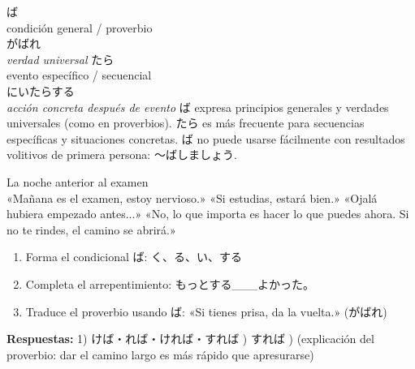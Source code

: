   {ば\\\small condición general / proverbio\\\small {}がばれ\\\textit{verdad universal}}
  {たら\\\small evento específico / secuencial\\\small {}にいたらする\\\textit{acción concreta después de evento}}
  {ば expresa principios generales y verdades universales (como en proverbios). たら es más frecuente para secuencias específicas y situaciones concretas. ば no puede usarse fácilmente con resultados volitivos de primera persona: 〜ばしましょう.}



{La noche anterior al examen\\[0.4em]
  «Mañana es el examen, estoy nervioso.» «Si estudias, estará bien.» «Ojalá hubiera empezado antes...» «No, lo que importa es hacer lo que puedes ahora. Si no te rindes, el camino se abrirá.»}

\begin{tcolorbox}[ejerciciobox, title={\emoji{pencil} Ejercicios}]
\begin{enumerate}
  \item Forma el condicional ば: く、る、い、する
  \item Completa el arrepentimiento: もっとする\_\_\_よかった。
  \item Traduce el proverbio usando ば: «Si tienes prisa, da la vuelta.» (がばれ)
\end{enumerate}
\textbf{Respuestas:}
1) けば・れば・ければ・すれば ) すれば ) (explicación del proverbio: dar el camino largo es más rápido que apresurarse)
\end{tcolorbox}

